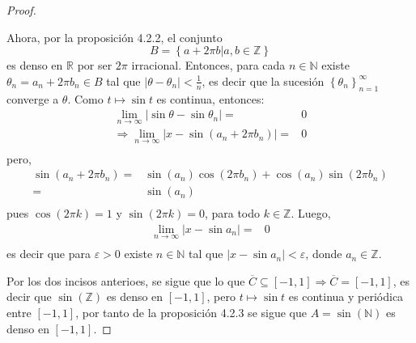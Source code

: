 \documentclass[12pt]{report}
\theoremstyle{largebreak}
\newcommand\abs[1]{\ensuremath{\big|#1\big|}}
\newcommand\Cls[1]{\ensuremath{\overline{#1}}}
\begin{document}
\begin{proof}
\begin{itemize}
            Ahora, por la proposición 4.2.2, el conjunto
            \begin{equation*}
                B=\left\{a+2\pi b\Big|a,b\in\mathbb{Z} \right\}
            \end{equation*}
            es denso en $\mathbb{R}$ por ser $2\pi$ irracional. Entonces, para cada $n\in\mathbb{N}$ existe $\theta_n=a_n+2\pi b_n\in B$ tal que $\abs{\theta-\theta_n}<\frac{1}{n}$, es decir que la sucesión $\left\{\theta_n \right\}_{n=1}^\infty$ converge a $\theta$. Como $t\mapsto\sin t$ es continua, entonces:
            \begin{equation*}
                \begin{split}
                    \lim_{n\rightarrow\infty }\abs{\sin\theta-\sin\theta_n}=&0\\
                    \Rightarrow \lim_{n\rightarrow\infty }\abs{x-\sin\left(a_n+2\pi b_n \right)}=&0\\
                \end{split}
            \end{equation*}
            pero,
            \begin{equation*}
                \begin{split}
                    \sin\left(a_n+2\pi b_n \right)=&\sin\left(a_n\right)\cos\left(2\pi b_n\right)+\cos\left(a_n\right)\sin\left(2\pi b_n \right)\\
                    =&\sin\left(a_n\right)\\
                \end{split}
            \end{equation*}
            pues $\cos(2\pi k)=1$ y $\sin(2\pi k)=0$, para todo $k\in\mathbb{Z}$. Luego,
            \begin{equation*}
                \begin{split}
                    \lim_{n\rightarrow\infty }\abs{x-\sin a_n}=&0\\
                \end{split}
            \end{equation*}
            es decir que para $\varepsilon>0$ existe $n\in\mathbb{N}$ tal que $\abs{x-\sin a_n}<\varepsilon$, donde $a_n\in\mathbb{Z}$. 
        \end{itemize}
        Por los dos incisos anterioes, se sigue que lo que $\Cls{C}\subseteq[-1,1]\Rightarrow \Cls{C}=[-1,1]$, es decir que $\sin(\mathbb{Z})$ es denso en $[-1,1]$, pero $t\mapsto\sin t$ es continua y periódica entre $[-1,1]$, por tanto de la proposición 4.2.3 se sigue que $A=\sin(\mathbb{N})$ es denso en $[-1,1]$.
    \end{proof}
\end{document}
